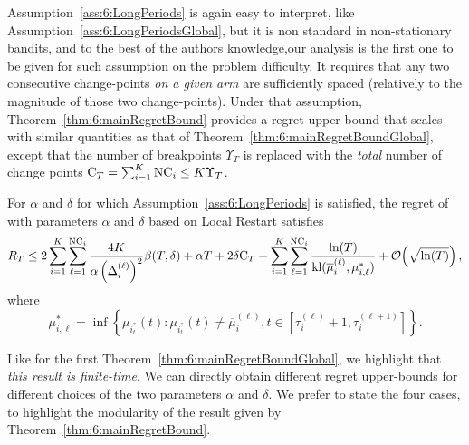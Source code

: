 Assumption~\ref{ass:6:LongPeriods} is again easy to interpret, like Assumption~\ref{ass:6:LongPeriodsGlobal}, but it is non standard in non-stationary bandits, and to the best of the authors knowledge,our analysis is the first one to be given for such assumption on the problem difficulty.
%
It requires that any two consecutive change-points \emph{on a given arm} are sufficiently spaced (relatively to the magnitude of those two change-points). Under that assumption, Theorem~\ref{thm:6:mainRegretBound} provides a regret upper bound that scales with similar quantities as that of Theorem~\ref{thm:6:mainRegretBoundGlobal}, except that the number of breakpoints $\Upsilon_T$ is replaced with the \emph{total} number of change points $\mathrm{C}_T = \sum_{i=1}^K \text{NC}_i \leq K \Upsilon_T$.

\begin{theorem}\label{thm:6:mainRegretBound}
    For $\alpha$ and $\delta$ for which Assumption~\ref{ass:6:LongPeriods} is satisfied, the regret of \GLRklUCB{} with parameters $\alpha$ and $\delta$ based on Local Restart satisfies
    \begin{equation}
        R_T \leq 2\sum_{i=1}^K\sum_{\ell=1}^{\text{NC}_i} \frac{4K}{\alpha \left(\Delta_i^{(\ell)}\right)^2}\beta(T,\delta) +\alpha T + 2 \delta \mathrm{C}_T  + \sum_{i=1}^K\sum_{\ell=1}^{\text{NC}_i} \frac{\ln(T)}{\mathrm{kl}(\overline{\mu}_i^{(\ell)},{\mu}^*_{i,\ell})} +\mathop{}\mathopen{}\mathcal{O}\mathopen{}\left(\sqrt{\ln(T)}\right),
    \end{equation}
    where
    \begin{equation}
        {\mu}^*_{i,\ell} = \inf \left\{ \mu_{i_t^*}(t) : \mu_{i_t^*}(t) \neq \overline{\mu}_i^{(\ell)}, t \in [\tau_i^{(\ell)}+1, \tau_i^{(\ell+1)}]\right\}.
    \end{equation}
\end{theorem}

Like for the first Theorem~\ref{thm:6:mainRegretBoundGlobal},
we highlight that \emph{this result is finite-time}.
%
We can directly obtain different regret upper-bounds for different choices of the two parameters $\alpha$ and $\delta$.
We prefer to state the four cases, to highlight the modularity of the result given by Theorem~\ref{thm:6:mainRegretBound}.

